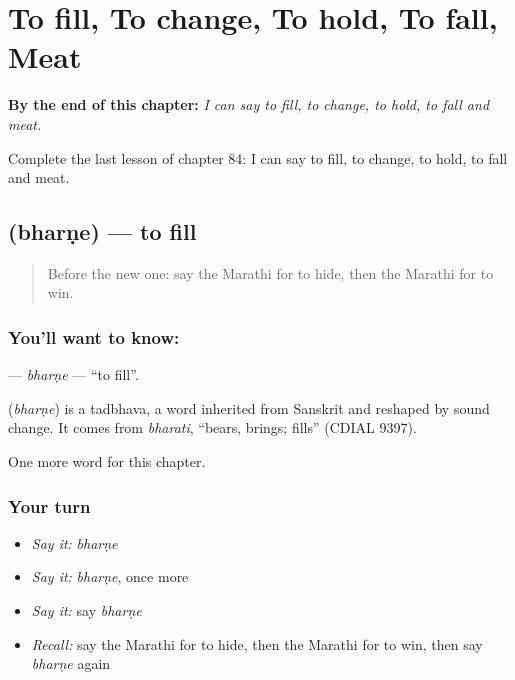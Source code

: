 
\chapter{To fill, To change, To hold, To fall, Meat}
\label{ch:mr-to-fill-to-change-to-hold-to-fall-meat}

\begin{chapteropening}
\textbf{By the end of this chapter:} \emph{I can say to fill, to change, to hold, to fall and meat.}

Complete the last lesson of chapter 84: I can say to fill, to change, to hold, to fall and meat.
\end{chapteropening}

\section[\texorpdfstring{\mr{भरणे} (bharṇe)}{भरणे (bharṇe)}]{ (bharṇe) — to fill}

\label{lesson:MR-C84-bharne}



\begin{quote}
Before the new one: say the Marathi for to hide, then the Marathi for to win.
\end{quote}

\subsection*{You'll want to know: }
\textbf{} — \emph{bharṇe} — \textquotedblleft{}to fill\textquotedblright{}.

\begin{cousinweb}
\textbf{} (\emph{bharṇe}) is a tadbhava, a word inherited from Sanskrit and reshaped by sound change. It comes from \emph{bharati}, \textquotedblleft{}bears, brings; fills\textquotedblright{} (CDIAL 9397).
\end{cousinweb}

\begin{grammarlens}[title={What you've built}]
One more word for this chapter.
\end{grammarlens}

\subsection*{Your turn}
\begin{itemize}
\raggedright
  \item \emph{Say it:} \emph{bharṇe}
  \item \emph{Say it:} \emph{bharṇe}, once more
  \item \emph{Say it:} say \emph{bharṇe}
  \item \emph{Recall:} say the Marathi for to hide, then the Marathi for to win, then say \emph{bharṇe} again
\end{itemize}

